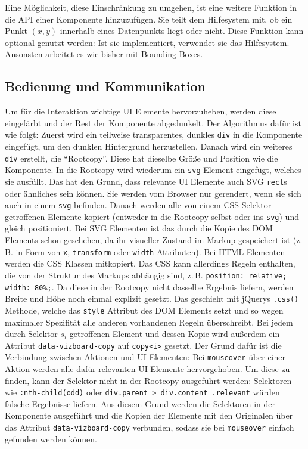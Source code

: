 \documentclass[
	headsepline,
	footsepline,
	fontsize=12pt,
	bibliography=totoc
]{scrbook}
\begin{document}
Eine Möglichkeit, diese Einschränkung zu umgehen, ist eine weitere Funktion in die API einer Komponente hinzuzufügen. Sie teilt dem Hilfesystem mit, ob ein Punkt $(x,y)$ innerhalb eines Datenpunkts liegt oder nicht. Diese Funktion kann optional genutzt werden: Ist sie implementiert, verwendet sie das Hilfesystem. Ansonsten arbeitet es wie bisher mit Bounding Boxes.

\subsection{Bedienung und Kommunikation}

Um für die Interaktion wichtige UI Elemente hervorzuheben, werden diese eingefärbt und der Rest der Komponente abgedunkelt. Der Algorithmus dafür ist wie folgt: Zuerst wird ein teilweise transparentes, dunkles \texttt{div} in die Komponente eingefügt, um den dunklen Hintergrund herzustellen. Danach wird ein weiteres \texttt{div} erstellt, die \enquote{Rootcopy}. Diese hat dieselbe Größe und Position wie die Komponente. In die Rootcopy wird wiederum ein \texttt{svg} Element eingefügt, welches sie ausfüllt. Das hat den Grund, dass relevante UI Elemente auch SVG \texttt{rect}s oder ähnliches sein können. Sie werden vom Browser nur gerendert, wenn sie sich auch in einem \texttt{svg} befinden. Danach werden alle von einem CSS Selektor getroffenen Elemente kopiert (entweder in die Rootcopy selbst oder ins \texttt{svg}) und gleich positioniert. Bei SVG Elementen ist das durch die Kopie des DOM Elements schon geschehen, da ihr visueller Zustand im Markup gespeichert ist (z.\,B. in Form von \texttt{x}, \texttt{transform} oder \texttt{width} Attributen). Bei HTML Elementen werden die CSS Klassen mitkopiert. Das CSS kann allerdings Regeln enthalten, die von der Struktur des Markups abhängig sind, z.\,B. \texttt{position: relative; width: 80\%;}. Da diese in der Rootcopy nicht dasselbe Ergebnis liefern, werden Breite und Höhe noch einmal explizit gesetzt. Das geschieht mit jQuerys \texttt{.css()} Methode, welche das \texttt{style} Attribut des DOM Elements setzt und so wegen maximaler Spezifität alle anderen vorhandenen Regeln überschreibt. Bei jedem durch Selektor $s_i$ getroffenen Element und dessen Kopie wird außerdem ein Attribut \texttt{data-vizboard-copy} auf \texttt{copy<i>} gesetzt. Der Grund dafür ist die Verbindung zwischen Aktionen und UI Elementen: Bei \texttt{mouseover} über einer Aktion werden alle dafür relevanten UI Elemente hervorgehoben. Um diese zu finden, kann der Selektor nicht in der Rootcopy ausgeführt werden: Selektoren wie \texttt{:nth-child(odd)} oder \texttt{div.parent > div.content .relevant} würden falsche Ergebnisse liefern. Aus diesem Grund werden die Selektoren in der Komponente ausgeführt und die Kopien der Elemente mit den Originalen über das Attribut \texttt{data-vizboard-copy} verbunden, sodass sie bei \texttt{mouseover} einfach gefunden werden können.
\end{document}
